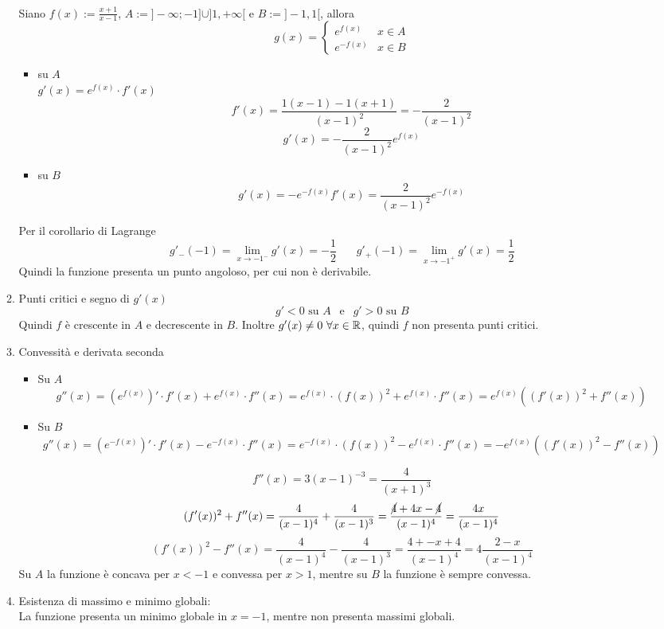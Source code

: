 \documentclass{article}
\begin{document}
\begin{enumerate}[label=\textbf{Esercizio 7.\arabic*.},itemindent=*]
\begin{enumerate}[label=\arabic*.,itemindent=*]
        \\ Siano $f(x):=\frac{x+1}{x-1}$, $A:=]-\infty;-1]\cup ]1,+\infty[$ e $B:=]-1,1[$, allora
        \[g(x)=\begin{cases}
            e^{f(x)}&x\in A\\
            e^{-f(x)}&x\in B
        \end{cases}\]
        \begin{itemize}
            \item su $A$
            \\ $g'(x)=e^{f(x)}\cdot f'(x)$\\
            \[f'(x)=\frac{1(x-1)-1(x+1)}{(x-1)^2}=-\frac{2}{(x-1)^2}\]
            \[g'(x)=-\frac{2}{(x-1)^2}e^{f(x)}\]
            \item su $B$\\
            \[g'(x)=-e^{-f(x)}f'(x)=\frac{2}{(x-1)^2}e^{-f(x)}\]
        \end{itemize}
        Per il corollario di Lagrange
        \[g'_-(-1)=\lim_{x\to-1^-}g'(x)=-\frac{1}{2}~~~~~~~~g'_+(-1)=\lim_{x\to-1^+}g'(x)=\frac{1}{2}\]
        Quindi la funzione presenta un punto angoloso, per cui non è derivabile.
        \item Punti critici e segno di $g'(x)$
        \[g'<0 \text{ su }A~~\text{ e }~~g'>0 \text{ su } B\]
        Quindi $f$ è crescente in $A$ e decrescente in $B$. Inoltre $g'(x)\neq0~\forall x \in \mathbb{R}$, quindi $f$ non presenta punti critici.
        \item Convessità e derivata seconda
        \begin{itemize}
            \item Su $A$
            \[g''(x)=(e^{f(x)})'\cdot f'(x)+e^{f(x)}\cdot f''(x)=e^{f(x)}\cdot (f(x))^2+e^{f(x)}\cdot f''(x)=e^{f(x)}((f'(x))^2+f''(x))\]
            \item Su $B$
            \[g''(x)=(e^{-f(x)})'\cdot f'(x)-e^{-f(x)}\cdot f''(x)=e^{-f(x)}\cdot (f(x))^2-e^{f(x)}\cdot f''(x)=-e^{f(x)}((f'(x))^2-f''(x))\]
        \end{itemize}
        \[f''(x)=3(x-1)^{-3}=\frac{4}{(x+1)^3}\]
        \[(f'(x))^2+f''(x)=\frac{4}{(x-1)^4}+\frac{4}{(x-1)^3}=\frac{\cancel{4}+4x-\cancel{4}}{(x-1)^4}=\frac{4x}{(x-1)^4}\]
        \[(f'(x))^2-f''(x)=\frac{4}{(x-1)^4}-\frac{4}{(x-1)^3}=\frac{4+-x+4}{(x-1)^4}=4\frac{2-x}{(x-1)^4}\]
        Su $A$ la funzione è concava per $x<-1$ e convessa per $x>1$, mentre su $B$ la funzione è sempre convessa.
        \item Esistenza di massimo e minimo globali:
        \\La funzione presenta un minimo globale in $x=-1$, mentre non presenta massimi globali.

\end{enumerate}
\end{enumerate}
\end{document}
